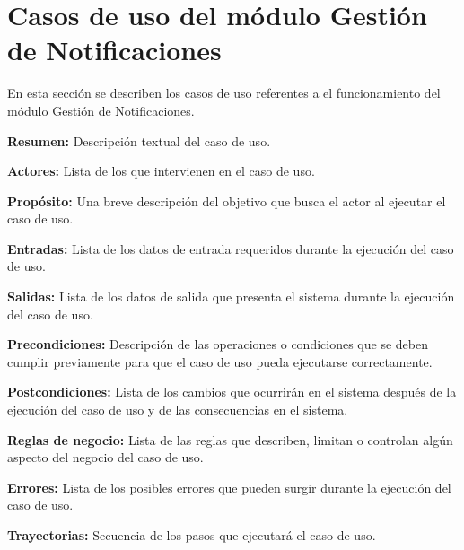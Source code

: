 
\section{Casos de uso del módulo Gestión de Notificaciones}
En esta sección se describen los casos de uso referentes a el funcionamiento del módulo Gestión de Notificaciones. \bigskip

     \begin{objetivos}
	\item {\bf Resumen:} Descripción textual del caso de uso.
	\item {\bf Actores:} Lista de los que intervienen en el caso de uso.
	\item {\bf Propósito:} Una breve descripción del objetivo que busca el actor al ejecutar el caso de uso.
	\item {\bf Entradas:} Lista de los datos de entrada requeridos durante la ejecución del caso de uso.
	\item {\bf Salidas:} Lista de los datos de salida que presenta el sistema durante la ejecución del caso de uso.
	\item {\bf Precondiciones:} Descripción de las operaciones o condiciones que se deben cumplir previamente para que el caso de uso pueda ejecutarse correctamente.
	\item {\bf Postcondiciones:} Lista de los cambios que ocurrirán en el sistema después de la ejecución del caso de uso y de las consecuencias en el sistema.
	\item {\bf Reglas de negocio:} Lista de las reglas que describen, limitan o controlan algún aspecto del negocio del caso de uso.
	\item {\bf Errores:} Lista de los posibles errores que pueden surgir durante la ejecución del caso de uso.
	\item {\bf Trayectorias:} Secuencia de los pasos que ejecutará el caso de uso.
    \end{objetivos}

